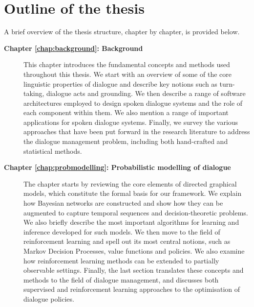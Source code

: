 
\section{Outline of the thesis}

A brief overview of the thesis structure, chapter by chapter, is provided below. 

\begin{description}
  \item[\textbf{Chapter \ref{chap:background}: Background}] \hfill  \vspace{2mm}
  
This chapter introduces the fundamental concepts and methods used throughout this thesis. We start with an overview of some of the core linguistic properties of dialogue and describe key notions such as turn-taking, dialogue acts and grounding.  We then describe a range of software architectures employed to design spoken dialogue systems and the role of each component within them.  We also mention a range of important applications for spoken dialogue systems. Finally, we survey the various approaches that have been put forward in the research literature to address the dialogue management problem, including both hand-crafted and statistical methods. \vspace{2mm}

  \item[\textbf{Chapter \ref{chap:probmodelling}: Probabilistic modelling of dialogue}] \hfill \vspace{2mm}

 The chapter starts by reviewing the core elements of directed graphical models, which constitute the formal basis for our framework.  We explain how Bayesian networks are constructed and show how they can be augmented to capture temporal sequences and decision-theoretic problems. We also briefly describe the most important algorithms for learning and inference developed for such models.  We then  move to the field of reinforcement learning and spell out its most central notions, such as Markov Decision Processes, value functions and policies. We also examine how reinforcement learning methods can be extended to partially observable settings.  Finally, the last section translates these concepts and methods to the field of dialogue management, and discusses both supervised and reinforcement learning approaches to the optimisation of dialogue policies.
 

\end{description}
